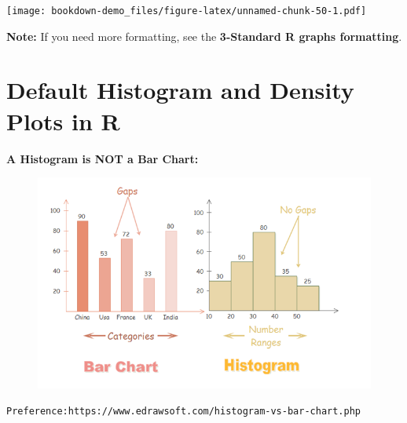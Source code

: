 \documentclass[]{book}
\newenvironment{Shaded}{\begin{snugshade}}{\end{snugshade}}
\newcommand{\KeywordTok}[1]{\textcolor[rgb]{0.13,0.29,0.53}{\textbf{#1}}}
\newcommand{\DataTypeTok}[1]{\textcolor[rgb]{0.13,0.29,0.53}{#1}}
\newcommand{\StringTok}[1]{\textcolor[rgb]{0.31,0.60,0.02}{#1}}
\newcommand{\CommentTok}[1]{\textcolor[rgb]{0.56,0.35,0.01}{\textit{#1}}}
\newcommand{\OtherTok}[1]{\textcolor[rgb]{0.56,0.35,0.01}{#1}}
\newcommand{\OperatorTok}[1]{\textcolor[rgb]{0.81,0.36,0.00}{\textbf{#1}}}
\newcommand{\NormalTok}[1]{#1}
\begin{document}
\begin{Shaded}
\end{Shaded}

\texttt{[image: bookdown-demo\_files/figure-latex/unnamed-chunk-50-1.pdf]}

\textbf{Note:} If you need more formatting, see the \textbf{3-Standard R
graphs formatting}.

\chapter{Default Histogram and Density Plots in
R}\label{default-histogram-and-density-plots-in-r}

\textbf{A Histogram is NOT a Bar Chart: }

\begin{figure}
\centering
\includegraphics{4.png}
\caption{}
\end{figure}

\begin{verbatim}
Preference:https://www.edrawsoft.com/histogram-vs-bar-chart.php
\end{verbatim}
\end{document}
